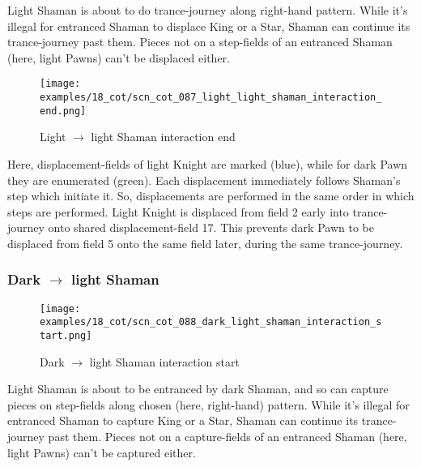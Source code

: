 Light Shaman is about to do trance-journey along right-hand pattern. While it's
illegal for entranced Shaman to displace King or a Star, Shaman can continue its
trance-journey past them. Pieces not on a step-fields of an entranced Shaman (here,
light Pawns) can't be displaced either.

\clearpage %

\noindent
\begin{figure}[!h]
\texttt{[image: examples/18\_cot/scn\_cot\_087\_light\_light\_shaman\_interaction\_end.png]}
\caption{Light $\rightarrow$ light Shaman interaction end}
\label{fig:scn_cot_087_light_light_shaman_interaction_end}
\end{figure}

Here, displacement-fields of light Knight are marked (blue), while for dark Pawn
they are enumerated (green). Each displacement immediately follows Shaman's step
which initiate it. So, displacements are performed in the same order in which steps
are performed. Light Knight is displaced from field 2 early into trance-journey
onto shared displacement-field 17. This prevents dark Pawn to be displaced from
field 5 onto the same field later, during the same trance-journey.

\clearpage %

\subsubsection*{Dark $\rightarrow$ light Shaman}
\label{sec:Conquest of Tlalocan/Trance-journey/Interactions/Dark --> light Shaman}

\vspace*{-1.4\baselineskip}
\noindent
\begin{figure}[!h]
\texttt{[image: examples/18\_cot/scn\_cot\_088\_dark\_light\_shaman\_interaction\_start.png]}
\caption{Dark $\rightarrow$ light Shaman interaction start}
\label{fig:scn_cot_088_dark_light_shaman_interaction_start}
\end{figure}

Light Shaman is about to be entranced by dark Shaman, and so can capture pieces
on step-fields along chosen (here, right-hand) pattern. While it's illegal for
entranced Shaman to capture King or a Star, Shaman can continue its trance-journey
past them. Pieces not on a capture-fields of an entranced Shaman (here, light Pawns)
can't be captured either.

